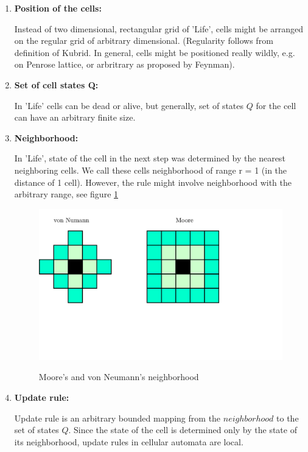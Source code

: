 \begin{enumerate}
\item \textbf{Position of the cells:}

Instead of two dimensional, rectangular grid of 'Life',
cells might be arranged on the regular grid of arbitrary dimensional. 
(Regularity follows from definition of Kubrid. In general, cells might be positioned really wildly,
e.g. on Penrose lattice, or arbritrary as proposed by Feynman).

\item \textbf{Set of cell states Q:}

In 'Life' cells can be dead or alive, but generally, set of states $Q$ for the cell can have an arbitrary finite size.
\bigskip

\item \textbf{Neighborhood:}

In 'Life', state of the cell in the next step was determined
by the nearest neighboring cells. We call these cells neighborhood of range r = 1 (in the distance of 1 cell).
However, the rule might involve neighborhood with the arbitrary range, see figure \ref{neighbor}

\begin{figure}
 \centering
 \includegraphics[width=1\textwidth]{./img/neighb}
 \label{neighbor}
 \caption{Moore's and von Neumann's neighborhood}
\end{figure}


\item \textbf{Update rule:}

Update rule is an arbitrary bounded mapping from the $neighborhood$ to the set of states $Q$.
Since the state of the cell is determined only by the state of its neighborhood, update rules in cellular automata are local.


\end{enumerate}
